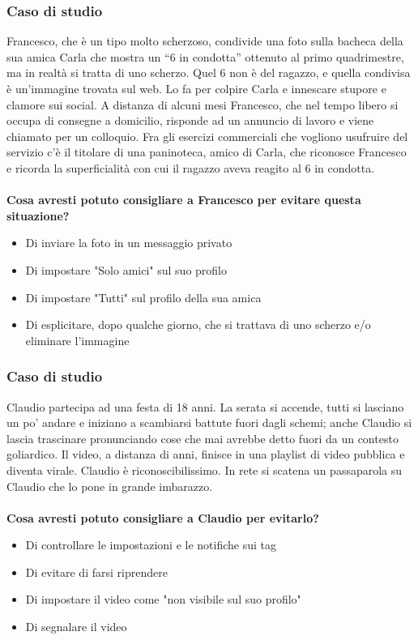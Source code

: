 \documentclass{article}
\begin{document}
	\subsubsection{Caso di studio}
	\label{sec:Caso3}
	Francesco, che è un tipo molto scherzoso, condivide una foto sulla bacheca della sua amica Carla che mostra un “6 in condotta” ottenuto al primo quadrimestre, ma in realtà si tratta di uno scherzo. Quel 6 non è del ragazzo, e quella condivisa è un’immagine trovata sul web. Lo fa per colpire Carla e innescare stupore e clamore sui social. A distanza di alcuni mesi Francesco, che nel tempo libero si occupa di consegne a domicilio, risponde ad un annuncio di lavoro e viene chiamato per un colloquio. Fra gli esercizi commerciali che vogliono usufruire del servizio c’è il titolare di una paninoteca, amico di Carla, che riconosce Francesco e ricorda la superficialità con cui il ragazzo aveva reagito al 6 in condotta.
	\\\vspace{5mm}\\
	\textbf{Cosa avresti potuto consigliare a Francesco per evitare questa situazione?}
	\begin{itemize}
		\item Di inviare la foto in un messaggio privato
		\item Di impostare "Solo amici" sul suo profilo
		\item Di impostare "Tutti" sul profilo della sua amica
		\item Di esplicitare, dopo qualche giorno, che si trattava di uno scherzo e/o eliminare l'immagine
	\end{itemize}
\subsubsection{Caso di studio}
\label{sec:Caso4}
Claudio partecipa ad una festa di 18 anni. La serata si accende, tutti si lasciano un po’ andare e iniziano a scambiarsi battute fuori dagli schemi; anche Claudio si lascia trascinare pronunciando cose che mai avrebbe detto fuori da un contesto goliardico. Il video, a distanza di anni, finisce in una playlist di video pubblica e diventa virale. Claudio è riconoscibilissimo. In rete si scatena un passaparola su Claudio che lo pone in grande imbarazzo.
\\\vspace{5mm}\\
\textbf{Cosa avresti potuto consigliare a Claudio per evitarlo?}
\begin{itemize}
	\item Di controllare le impostazioni e le notifiche sui tag
	\item Di evitare di farsi riprendere
	\item Di impostare il video come "non visibile sul suo profilo"
	\item Di segnalare il video
\end{itemize}
\end{document}
